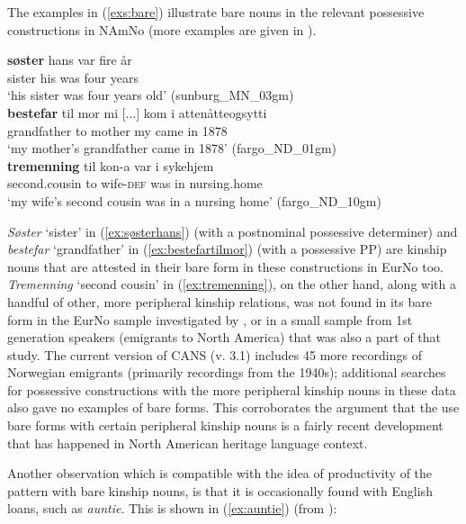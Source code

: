 \documentclass[output=paper,colorlinks,citecolor=brown]{langscibook}
\begin{document}
The examples in (\ref{exs:bare}) illustrate bare nouns in the relevant possessive constructions in NAmNo (more examples are given in \citealt{kinn2021split}). 

\ea \label{exs:bare}
\ea  \label{ex:søsterhans} \gll \textbf{søster} hans var fire år\\
sister his was four years \\
\glt `his sister was four years old' (sunburg\_MN\_03gm)\\
\ex \label{ex:bestefartilmor} \gll \textbf{bestefar} til mor mi  [...] kom i attenåtteogsytti \\
grandfather to mother my {} came in 1878 \\
\glt `my mother's grandfather came in 1878' (fargo\_ND\_01gm)\\
\ex \label{ex:tremenning} \gll \textbf{tremenning} til kon-a var i sykehjem \\
second.cousin to wife-\textsc{def} was in nursing.home \\
\glt `my wife's second cousin was in a nursing home' (fargo\_ND\_10gm)\\
\z
\z 

\noindent \emph{Søster} `sister' in  (\ref{ex:søsterhans}) (with a postnominal possessive determiner) and  \emph{bestefar} `grandfather' in (\ref{ex:bestefartilmor}) (with a possessive PP) are kinship nouns that are attested in their bare form in these constructions in EurNo too. \emph{Tremenning} `second cousin' in (\ref{ex:tremenning}), on the other hand, along with a handful of other, more peripheral kinship relations, was not found in its bare form in the EurNo sample investigated by \citet{kinn2021split}, or in a small sample from 1st generation speakers (emigrants to North America) that was also a part of that study. The current version of CANS (v. 3.1) includes 45 more recordings of Norwegian emigrants (primarily recordings from the 1940s); additional searches for possessive constructions with the more peripheral kinship nouns in these data also gave no examples of bare forms. This corroborates the argument that the use bare forms with certain peripheral kinship nouns is a fairly  recent development that has happened in North American heritage language context.

Another observation which is compatible with the idea of productivity of the pattern with bare kinship nouns, is that it is occasionally found with English loans, such as \emph{auntie}. This is shown in (\ref{ex:auntie}) (from \citealt[195]{kinn2021split}):
\end{document}
